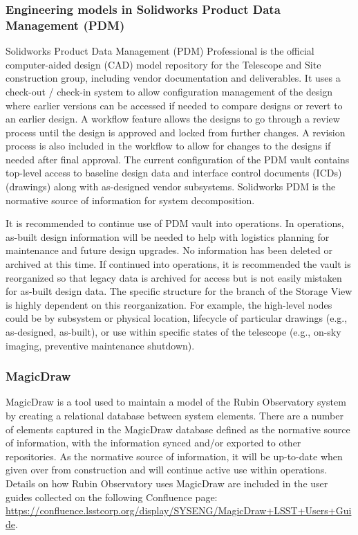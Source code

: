 \subsubsection{Engineering models in Solidworks Product Data Management (PDM)}

Solidworks Product Data Management (PDM) Professional \citep{PDM-cite} is the official computer-aided design (CAD) model repository for the Telescope and Site construction group, including vendor documentation and deliverables.
It uses a check-out / check-in system to allow configuration management of the design where earlier versions can be accessed if needed to compare designs or revert to an earlier design.
A workflow feature allows the designs to go through a review process until the design is approved and locked from further changes.
A revision process is also included in the workflow to allow for changes to the designs if needed after final approval.
The current configuration of the PDM vault contains top-level access to baseline design data and interface control documents (ICDs) (drawings) along with as-designed vendor subsystems.
Solidworks PDM is the normative source of information for system decomposition.

It is recommended to continue use of PDM vault into operations.
In operations, as-built design information will be needed to help with logistics planning for maintenance and future design upgrades.
No information has been deleted or archived at this time.
If continued into operations, it is recommended the vault is reorganized so that legacy data is archived for access but is not easily mistaken for as-built design data.
The specific structure for the branch of the Storage View is highly dependent on this reorganization.
For example, the high-level nodes could be by subsystem or physical location, lifecycle of particular drawings (e.g., as-designed, as-built), or use within specific states of the telescope (e.g., on-sky imaging, preventive maintenance shutdown).

\subsubsection{MagicDraw}

MagicDraw \citep{MagicDraw-cite} is a tool used to maintain a model of the Rubin Observatory system by creating a relational database between system elements.
There are a number of elements captured in the MagicDraw database defined as the normative source of information, with the information synced and/or exported to other repositories.
As the normative source of information, it will be up-to-date when given over from construction and will continue active use within operations.
Details on how Rubin Observatory uses MagicDraw are included in the user guides collected on the following Confluence page: \url{https://confluence.lsstcorp.org/display/SYSENG/MagicDraw+LSST+Users+Guide}.

